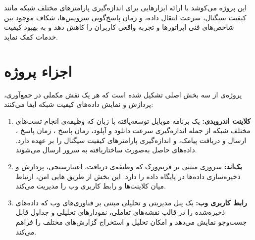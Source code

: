 این پروژه می‌کوشد با ارائه ابزارهایی برای اندازه‌گیری پارامترهای مختلف شبکه مانند کیفیت سیگنال، سرعت انتقال داده، و زمان پاسخ‌گویی سرویس‌ها، شکاف موجود بین شاخص‌های فنی اپراتورها و تجربه واقعی کاربران را کاهش دهد و به بهبود کیفیت خدمات کمک نماید.

\section{اجزاء پروژه}

پروژه‌ی  از سه بخش اصلی تشکیل شده است که هر یک نقش مکملی در جمع‌آوری، پردازش و نمایش داده‌های کیفیت شبکه ایفا می‌کنند:

\begin{enumerate}
    \item \textbf{کلاینت اندرویدی:}  
    یک برنامه موبایل توسعه‌یافته با زبان  که وظیفه‌ی انجام تست‌های مختلف شبکه از جمله اندازه‌گیری سرعت دانلود و آپلود، زمان پاسخ ، زمان پاسخ ، ارسال و دریافت پیامک، و اندازه‌گیری پارامترهای کیفیت سیگنال را بر عهده دارد. داده‌های حاصل به‌صورت ساختاریافته به سرور ارسال می‌شوند.

    \item \textbf{بک‌اند:}  
    سروری مبتنی بر فریم‌ورک  که وظیفه‌ی دریافت، اعتبارسنجی، پردازش و ذخیره‌سازی داده‌ها در پایگاه داده  را دارد. این بخش از طریق هایی امن، ارتباط میان کلاینت‌ها و رابط کاربری وب را مدیریت می‌کند.

    \item \textbf{رابط کاربری وب:}  
    یک پنل مدیریتی و تحلیلی مبتنی بر فناوری‌های وب که داده‌های ذخیره‌شده را در قالب نقشه‌های تعاملی، نمودارهای تحلیلی و جداول قابل جست‌وجو نمایش می‌دهد و امکان تحلیل و استخراج گزارش‌های مختلف را فراهم می‌کند.
\end{enumerate}
